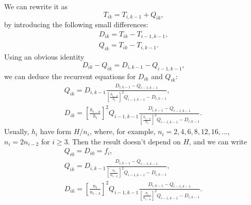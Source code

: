 \documentclass[11pt, twoside, twocolumn, paper = letter]{scrartcl}
\begin{document}
We can rewrite it as
\begin{equation*}
    T_{ik} = T_{i, k-1} + Q_{ik}
    \text{,}
\end{equation*}
by introducing the following small differences:
\begin{equation*}
    \begin{gathered}
        D_{ik} = T_{ik} - T_{i - 1, k - 1}
        \text{,}\\
        Q_{ik} = T_{ik} - T_{i, k - 1}
        \text{.}
    \end{gathered}
\end{equation*}
Using an obvious identity
\begin{equation*}
    D_{ik} - Q_{ik} = D_{i, k - 1} - Q_{i - 1, k - 1}
    \text{,}
\end{equation*}
we can deduce the recurrent equations for $D_{ik}$ and $Q_{ik}$:
\begin{equation*}
    \begin{gathered}
        Q_{ik}
          = D_{i, k - 1}
            \frac{D_{i, k - 1} - Q_{i - 1, k - 1}}
                 {
                    \left[\frac{h_{i - k}}{h_i}\right]^2 Q_{i - 1, k - 1} - D_{i, k - 1}
                 }
        \text{,}\\
        D_{ik}
          = \left[\frac{h_{i - k}}{h_i}\right]^2 Q_{i - 1, k - 1}
            \frac
            {
                D_{i, k - 1} - Q_{i - 1, k - 1}
            }
            {
                \left[\frac{h_{i - k}}{h_i}\right]^2 Q_{i - 1, k - 1} - D_{i, k - 1}
            }
        \text{.}
    \end{gathered}
\end{equation*}
Usually, $h_i$ have form $H / n_i$, where, for example, $n_i = 2, 4, 6, 8, 12, 16, \ldots$, $n_i = 2
n_{i - 2}$ for $i \geqslant 3$. Then the result doesn't depend on $H$, and we can write
\begin{equation*}
    \begin{gathered}
        Q_{i0} = D_{i0} = f_i
        \text{,}\\
        Q_{ik}
          = D_{i, k - 1}
            \frac{D_{i, k - 1} - Q_{i - 1, k - 1}}
                 {
                    \left[\frac{n_i}{n_{i - k}}\right]^2 Q_{i - 1, k - 1} - D_{i, k - 1}
                 }
        \text{,}\\
        D_{ik}
          = \left[\frac{n_i}{n_{i - k}}\right]^2 Q_{i - 1, k - 1}
            \frac
            {
                D_{i, k - 1} - Q_{i - 1, k - 1}
            }
            {
                \left[\frac{n_i}{n_{i - k}}\right]^2 Q_{i - 1, k - 1} - D_{i, k - 1}
            }
        \text{.}
    \end{gathered}
\end{equation*}
\end{document}
